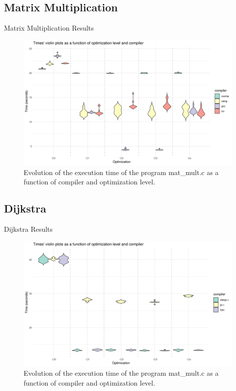 \documentclass{beamer}
\begin{document}
    \subsection{Matrix Multiplication}
    \begin{frame}{Matrix Multiplication Results}
        \begin{figure}[H]
        \centering
        \includegraphics[width=1\textwidth]{img/plots/violin_plot_mat_mult.png}
        \caption{Evolution of the execution time of the program mat\_mult.c as a function of compiler and optimization level.}
        \label{fig:image1}
        \end{figure}
    \end{frame}
    
    \subsection{Dijkstra}
    \begin{frame}{Dijkstra Results}
        \begin{figure}[H]
        \centering
        \includegraphics[width=1\textwidth]{img/plots/violin_plot_dijkstra.png}
        \caption{Evolution of the execution time of the program mat\_mult.c as a function of compiler and optimization level.}
        \label{fig:image2}
        \end{figure}
    \end{frame}
    
\end{document}
